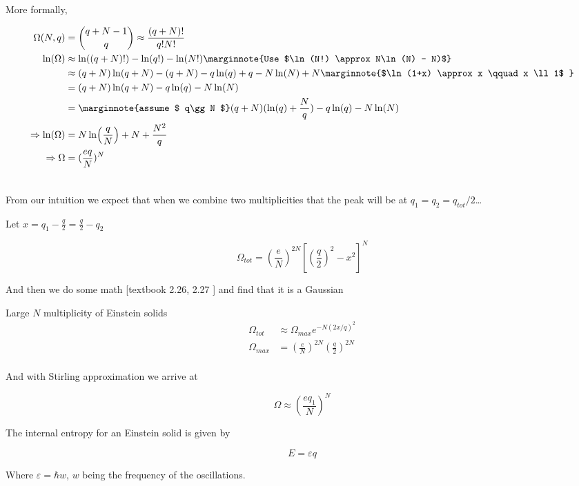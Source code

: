 \documentclass[10pt]{article}
\begin{document}
More formally,


\begin{equation}
	\begin{split}
		\Omega(N, q)  &=  \binom{q+N-1}{q} \approx \frac{(q+N)!}{q!N!} \\
		\ln(\Omega)&\approx \ln((q+N)!) -\ln(q!) - \ln(N!) \marginnote{Use $\ln(N!) \approx N\ln(N) - N)$} \\
							&\approx (q+N)\ln(q+N)  - (q+N) - q\ln(q) + q - N\ln(N) + N \marginnote{$\ln(1+x) \approx x \qquad x \ll 1$ }\\
&= (q+N)\ln(q+N) - q\ln(q) - N\ln(N) \\
&= \marginnote{assume $ q\gg N $} (q+N)(\ln(q) + \frac{N}{q}) - q\ln(q) - N \ln(N)\\
\Rightarrow\ln(\Omega) &= N \ln(\frac{q}{N}) + N + \frac{N^2}{q} \\
\Rightarrow \Omega &= (\frac{eq}{N})^N  \\  \\
	\end{split}
\end{equation}

From our intuition we expect that when we combine two multiplicities that the peak will be at $ q_1 = q_2 = q_{tot}/2 $\ldots


Let $ x = q_1 - \frac{q}{2} = \frac{q}{2} - q_2 $

\begin{equation}
	\Omega_{tot} = (\frac{e}{N})^{2N} [(\frac{q}{2})^2 - x^2]^N
\end{equation}

And then we do some math [textbook 2.26, 2.27 ] and find that it is a Gaussian


\begin{definition}
	Large $ N $ multiplicity of Einstein solids
	\begin{equation}
		\begin{split}
			\Omega_{tot}&\approx \Omega_{max} e^{-N(2x/q)^2} \\
			\Omega_{max}&= (\frac{e}{N})^{2N} (\frac{q}{2})^{2N}  \\
		\end{split}
	\end{equation}

	And with Stirling approximation we arrive at

	\begin{equation}
		\Omega \approx \left( \frac{eq_1}{N} \right)^N
		\label{eq:294:omega_stirling}
	\end{equation}

	The internal entropy for an Einstein solid is given by

	\begin{equation}
		E = \varepsilon q
	\end{equation}

	Where $ \varepsilon = \hbar w $, $ w $ being the frequency of the oscillations.
	
	

\end{definition}
\end{document}
